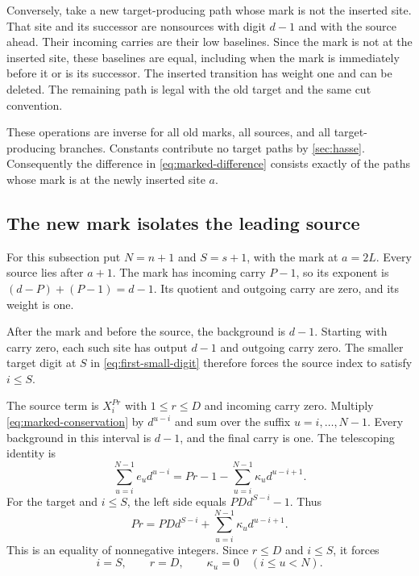 Conversely, take a new target-producing path whose mark is not
the inserted site. That site and its successor are nonsources
with digit $d-1$ and with the source ahead. Their incoming
carries are their low baselines. Since the mark is not at the
inserted site, these baselines are equal, including when the
mark is immediately before it or is its successor. The inserted
transition has weight one and can be deleted. The remaining
path is legal with the old target and the same cut convention.

These operations are inverse for all old marks, all sources,
and all target-producing branches. Constants contribute no
target paths by \cref{sec:hasse}. Consequently the difference
in \eqref{eq:marked-difference} consists exactly of the paths
whose mark is at the newly inserted site $a$.

\subsection{The new mark isolates the leading source}

For this subsection put $N=n+1$ and $S=s+1$, with the mark
at $a=2L$. Every source lies after $a+1$. The mark has
incoming carry $P-1$, so its exponent is
$(d-P)+(P-1)=d-1$. Its quotient and outgoing carry are zero,
and its weight is one.

After the mark and before the source, the background is $d-1$.
Starting with carry zero, each such site has output $d-1$ and
outgoing carry zero. The smaller target digit at $S$ in
\eqref{eq:first-small-digit} therefore forces the source index
to satisfy $i\le S$.

The source term is $X_i^{Pr}$ with $1\le r\le D$ and
incoming carry zero. Multiply \eqref{eq:marked-conservation}
by $d^{u-i}$ and sum over the suffix $u=i,\ldots,N-1$.
Every background in this interval is $d-1$, and the final
carry is one. The telescoping identity is
\begin{equation}
 \sum_{u=i}^{N-1}e_ud^{u-i}
       =Pr-1-\sum_{u=i}^{N-1}\kappa_ud^{u-i+1}.
 \label{eq:suffix-weight}
\end{equation}
For the target and $i\le S$, the left side equals
$PDd^{S-i}-1$. Thus
\begin{equation}
 Pr=PDd^{S-i}+\sum_{u=i}^{N-1}\kappa_ud^{u-i+1}.
 \label{eq:loss-identity}
\end{equation}
This is an equality of nonnegative integers. Since $r\le D$
and $i\le S$, it forces
\begin{equation}
 i=S,\qquad r=D,\qquad \kappa_u=0\quad(i\le u<N).
 \label{eq:unique-source}
\end{equation}

